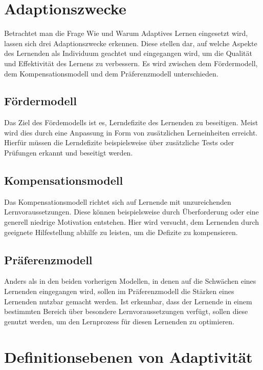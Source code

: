 \section{Adaptionszwecke}
Betrachtet man die Frage Wie und Warum Adaptives Lernen eingesetzt wird, lassen sich drei Adaptionszwecke erkennen.
Diese stellen dar, auf welche Aspekte des Lernenden als Individuum geachtet und eingegangen wird, um die
Qualität und Effektivität des Lernens zu verbessern.
Es wird zwischen dem Fördermodell, dem Kompensationsmodell und dem Präferenzmodell unterschieden.

\subsection{Fördermodell}
Das Ziel des Fördemodells ist es, Lerndefizite des Lernenden zu beseitigen.
Meist wird dies durch eine Anpassung in Form von zusätzlichen Lerneinheiten erreicht.
Hierfür müssen die Lerndefizite beispielsweise über zusätzliche Tests oder Prüfungen erkannt
und beseitigt werden. \cite[S. 19]{lehmann2010lernstile}

\subsection{Kompensationsmodell}
Das Kompensationsmodell richtet sich auf Lernende mit unzureichenden Lernvoraussetzungen.
Diese können beispielsweise durch Überforderung oder eine generell niedrige Motivation entstehen.
Hier wird versucht, dem Lernenden durch geeignete Hilfestellung abhilfe zu leisten, um die Defizite zu kompensieren.
\cite[S. 19]{lehmann2010lernstile}

\subsection{Präferenzmodell}
Anders als in den beiden vorherigen Modellen, in denen auf die Schwächen eines Lernenden eingegangen wird,
sollen im Präferenzmodell die Stärken eines Lernenden nutzbar gemacht werden. Ist erkennbar, dass
der Lernende in einem bestimmten Bereich über besondere Lernvoraussetzungen verfügt, sollen diese genutzt werden,
um den Lernprozess für diesen Lernenden zu optimieren.
\cite[S. 19]{lehmann2010lernstile}

\section{Definitionsebenen von Adaptivität}
